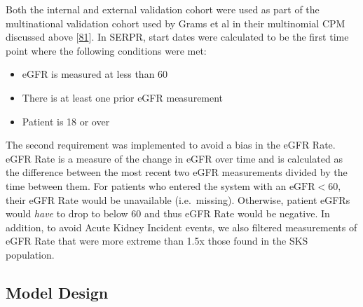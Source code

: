 \documentclass[12pt,PhD,twoside,openright]{muthesis}
\providecommand{\tightlist}{%
  \setlength{\itemsep}{0pt}\setlength{\parskip}{0pt}}
\begin{document}
Both the internal and external validation cohort were used as part of the multinational validation cohort used by Grams et al in their multinomial CPM discussed above {[}\protect\hyperlink{ref-grams_predicting_2018}{81}{]}. In SERPR, start dates were calculated to be the first time point where the following conditions were met:
\begin{itemize}
\tightlist
\item
  eGFR is measured at less than 60
\item
  There is at least one prior eGFR measurement
\item
  Patient is 18 or over
\end{itemize}
The second requirement was implemented to avoid a bias in the eGFR Rate. eGFR Rate is a measure of the change in eGFR over time and is calculated as the difference between the most recent two eGFR measurements divided by the time between them. For patients who entered the system with an \(\textrm{eGFR} < 60\), their eGFR Rate would be unavailable (i.e.~missing). Otherwise, patient eGFRs would \emph{have} to drop to below 60 and thus eGFR Rate would be negative. In addition, to avoid Acute Kidney Incident events, we also filtered measurements of eGFR Rate that were more extreme than 1.5x those found in the SKS population.

\hypertarget{model-design}{%
\subsection{Model Design}\label{model-design}}
\end{document}
